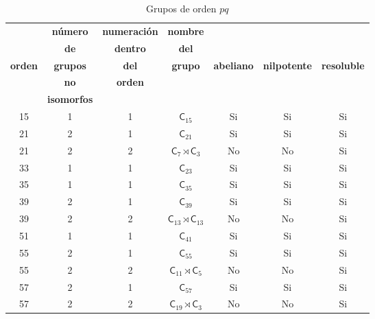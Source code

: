 \documentclass[final,12pt,a4paper,twoside,fleqn]{extbook}
\newcommand{\grclass}[1]{\ensuremath{\mathsf{#1}}}
\newcommand{\cyclicgr}[1]{\ensuremath{{\grclass{C}}_{#1}}}
\theoremstyle{definition}
\theoremstyle{remark}
\begin{document}
\begin{table}[h!]
    \begin{center}
        \caption{Grupos de orden $pq$}
        \label{tab:GruposOrdenPQ}
        \begin{tabular}{c|c|c|c|c|c|c} %
            \textbf{} & \tiny\textbf{n\'umero} &\tiny\textbf{numeraci\'on} & \tiny\textbf{nombre} & \textbf{} & {} & {} \\
            \textbf{} & \tiny\textbf{de} &\tiny\textbf{dentro} & \tiny\textbf{del} & \tiny\textbf{} & {} & {} \\
            \tiny\textbf{orden} & \tiny\textbf{grupos} & \tiny\textbf{del} & \tiny\textbf{grupo} & \tiny\textbf{abeliano}  &
            \tiny\textbf{nilpotente} & \tiny\textbf{resoluble} \\
            \textbf{} & \tiny\textbf{no} & \tiny\textbf{orden} & \textbf{} & \textbf{} & {} & {} \\
            \textbf{} & \tiny\textbf{isomorfos} &\textbf{} & \textbf{} & \textbf{} & {} & {} \\
            \hline
            15 & 1 & 1 & ${{\mathsf{C}}_{15}}$ & Si & Si & Si \\
            \hline
            21 & 2 & 1  & ${{\mathsf{C}}_{21}}$ & Si & Si & Si \\
            \hline
            21 & 2 & 2  & ${{\cyclicgr{7}}\rtimes{\cyclicgr{3}}}$ & No & No & Si \\
            \hline
            33 & 1 & 1 & ${{\mathsf{C}}_{23}}$ & Si & Si & Si \\
            \hline
            35 & 1 & 1 & ${{\mathsf{C}}_{35}}$ & Si & Si & Si \\
            \hline
            39 & 2 & 1 & ${{\mathsf{C}}_{39}}$ & Si & Si & Si \\
            \hline
            39 & 2 & 2 & ${{\mathsf{C}}_{13}}\rtimes{{\mathsf{C}}_{13}}$ & No & No & Si \\
            \hline
            51 & 1 & 1 & ${{\mathsf{C}}_{41}}$ & Si & Si & Si \\
            \hline
            55 & 2 & 1 & ${{\mathsf{C}}_{55}}$ & Si & Si & Si \\
            \hline
            55 & 2 & 2 & ${{\mathsf{C}}_{11}}\rtimes{{\mathsf{C}}_{5}}$ & No & No & Si \\
            \hline
            57 & 2 & 1 & ${{\mathsf{C}}_{57}}$ & Si & Si & Si \\
            \hline
            57 & 2 & 2 & ${{\mathsf{C}}_{19}}\rtimes{{\mathsf{C}}_{3}}$ & No & No & Si \\
            \hline
        \end{tabular}
    \end{center}
\end{table}
\end{document}
